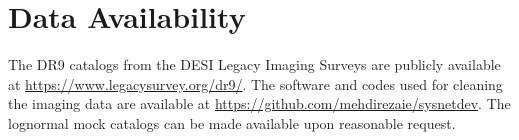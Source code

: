 \section*{Data Availability}
\label{sec:dataavail}
The DR9 catalogs from the DESI Legacy Imaging Surveys are publicly available at \href{https://www.legacysurvey.org/dr9/}{https://www.legacysurvey.org/dr9/}. The software and codes used for cleaning the imaging data are available at \href{https://github.com/mehdirezaie/sysnetdev}{https://github.com/mehdirezaie/sysnetdev}. The lognormal mock catalogs can be made available upon reasonable request.